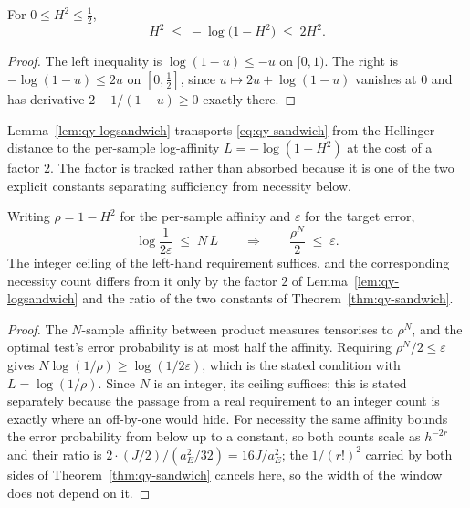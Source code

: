 \begin{lemma}
\label{lem:qy-logsandwich}
For $0\le H^{2}\le\tfrac12$,
\begin{equation}
H^{2}\;\leq\;-\log\bigl(1-H^{2}\bigr)\;\leq\;2H^{2}.
\label{eq:qy-logsandwich}
\end{equation}
\end{lemma}

\begin{proof}
The left inequality is $\log(1-u)\le-u$ on $[0,1)$. The right is $-\log(1-u)\le2u$ on
$[0,\tfrac12]$, since $u\mapsto2u+\log(1-u)$ vanishes at $0$ and has derivative
$2-1/(1-u)\ge0$ exactly there.
\end{proof}


Lemma~\ref{lem:qy-logsandwich} transports \eqref{eq:qy-sandwich} from the Hellinger distance to the
per-sample log-affinity $L=-\log(1-H^{2})$ at the cost of a factor $2$. The factor is
tracked rather than absorbed because it is one of the two explicit constants separating
sufficiency from necessity below.

\begin{theorem}
\label{thm:qy-samples}
Writing $\rho=1-H^{2}$ for the per-sample affinity and $\varepsilon$ for the target error,
\begin{equation}
\log\frac{1}{2\varepsilon}\;\leq\;N\,L
\qquad\Longrightarrow\qquad
\frac{\rho^{N}}{2}\;\leq\;\varepsilon .
\label{eq:qy-samples}
\end{equation}
The integer ceiling of the left-hand requirement suffices, and the corresponding necessity
count differs from it only by the factor $2$ of Lemma~\ref{lem:qy-logsandwich} and the ratio of
the two constants of Theorem~\ref{thm:qy-sandwich}.
\end{theorem}

\begin{proof}
The $N$-sample affinity between product measures tensorises to $\rho^{N}$, and the optimal
test's error probability is at most half the affinity. Requiring $\rho^{N}/2\le\varepsilon$
gives $N\log(1/\rho)\ge\log(1/2\varepsilon)$, which is the stated condition with
$L=\log(1/\rho)$. Since $N$ is an integer, its ceiling suffices; this is stated separately
because the passage from a real requirement to an integer count is exactly where an
off-by-one would hide. For necessity the same affinity bounds the error probability from
below up to a constant, so both counts scale as $h^{-2r}$ and their ratio is
$2\cdot(J/2)/(a_{E}^{2}/32)=16J/a_{E}^{2}$; the $1/(r!)^{2}$ carried by both sides of
Theorem~\ref{thm:qy-sandwich} cancels here, so the width of the window does not depend on it.
\end{proof}

